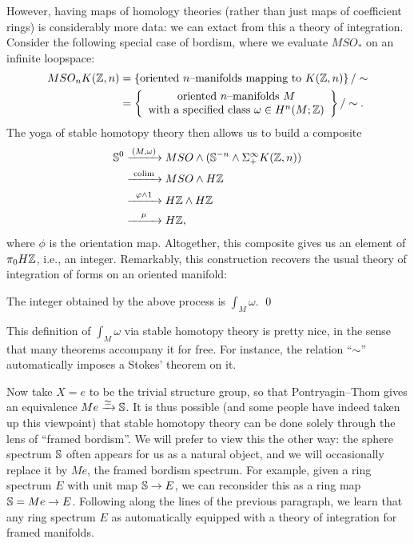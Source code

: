 However, having maps of homology theories (rather than just maps of coefficient rings) is considerably more data: we can extact from this a theory of integration.  Consider the following special case of bordism, where we evaluate $MSO_*$ on an infinite loopspace:
\begin{align*}
MSO_n K(\Z, n) & = \left\{ \text{oriented $n$--manifolds mapping to $K(\Z, n)$} \right\} / \sim \\
& = \left\{ \begin{array}{c}\text{oriented $n$--manifolds $M$} \\ \text{with a specified class $\omega \in H^n(M; \Z)$} \end{array}\right\} / \sim.
\end{align*}
The yoga of stable homotopy theory then allows us to build a composite
\begin{align*}
\S^0 & \xrightarrow{\mathmakebox[2.5em]{(M, \omega)}} MSO \sm (\S^{-n} \sm \Susp^\infty_+ K(\Z, n)) \\ 
& \xrightarrow{\mathmakebox[2.5em]{\colim}} MSO \sm H\Z \\
& \xrightarrow{\mathmakebox[2.5em]{\phi \sm 1}} H\Z \sm H\Z \\
& \xrightarrow{\mathmakebox[2.5em]{\mu}} H\Z,
\end{align*}
where $\phi$ is the orientation map.  Altogether, this composite gives us an element of $\pi_0 H\Z$, i.e., an integer.  Remarkably, this construction recovers the usual theory of integration of forms on an oriented manifold:

\begin{lemma}
The integer obtained by the above process is $\int_M \omega$. \qed
\end{lemma}

\noindent This definition of $\int_M \omega$ via stable homotopy theory is pretty nice, in the sense that many theorems accompany it for free.  For instance, the relation ``$\sim$'' automatically imposes a Stokes' theorem on it.

Now take $X = e$ to be the trivial structure group, so that Pontryagin--Thom gives an equivalence $Me \xrightarrow{\simeq} \S$.  It is thus possible (and some people have indeed taken up this viewpoint) that stable homotopy theory can be done solely through the lens of ``framed bordism''.  We will prefer to view this the other way: the sphere spectrum $\S$ often appears for us as a natural object, and we will occasionally replace it by $Me$, the framed bordism spectrum.  For example, given a ring spectrum $E$ with unit map $\S \to E$, we can reconsider this as a ring map $\S = Me \to E$.  Following along the lines of the previous paragraph, we learn that any ring spectrum $E$ as automatically equipped with a theory of integration for framed manifolds.

